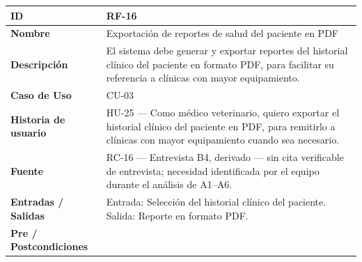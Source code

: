 \documentclass[
]{article}
\newcounter{none} %
\begin{document}
{\def\LTcaptype{none} %
\begin{longtable}[]{|
  >{\raggedright\arraybackslash}p{}|
  >{\raggedright\arraybackslash}p{}|}
\hline
\begin{minipage}[b]{\linewidth}\raggedright
\textbf{ID}
\end{minipage} & \begin{minipage}[b]{\linewidth}\raggedright
RF-16
\end{minipage} \\
\hline
\endhead
\hline
\endlastfoot
\textbf{Nombre} & \begin{minipage}[t]{\linewidth}\raggedright
Exportación de reportes de salud del paciente en PDF
\end{minipage} \\
\hline
\textbf{Descripción} & \begin{minipage}[t]{\linewidth}\raggedright
El sistema debe generar y exportar reportes del historial clínico del paciente en formato PDF, para facilitar su referencia a clínicas con mayor equipamiento.
\end{minipage} \\
\hline
\textbf{Caso de Uso} & \begin{minipage}[t]{\linewidth}\raggedright
CU-03
\end{minipage} \\
\hline
\textbf{Historia de usuario} & \begin{minipage}[t]{\linewidth}\raggedright
HU-25 — Como médico veterinario, quiero exportar el historial clínico del paciente en PDF, para remitirlo a clínicas con mayor equipamiento cuando sea necesario.
\end{minipage} \\
\hline
\textbf{Fuente} & \begin{minipage}[t]{\linewidth}\raggedright
RC-16 — Entrevista B4, derivado — sin cita verificable de entrevista; necesidad identificada por el equipo durante el análisis de A1–A6.
\end{minipage} \\
\hline
\textbf{Entradas / Salidas} & \begin{minipage}[t]{\linewidth}\raggedright
Entrada: Selección del historial clínico del paciente. Salida: Reporte en formato PDF.
\end{minipage} \\
\hline
\textbf{Pre / Postcondiciones} & \begin{minipage}[t]{\linewidth}\raggedright

\end{minipage}
\end{longtable}}
\end{document}
